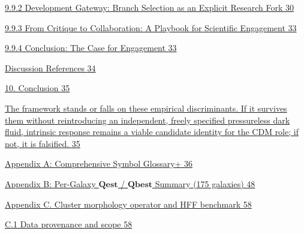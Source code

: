 \documentclass[11pt]{article}
\begin{document}
\hyperref[development-gateway-branch-selection-as-an-explicit-research-fork]{9.9.2 Development Gateway: Branch Selection as an Explicit Research Fork \hyperref[development-gateway-branch-selection-as-an-explicit-research-fork]{30}}

\hyperref[from-critique-to-collaboration-a-playbook-for-scientific-engagement]{9.9.3 From Critique to Collaboration: A Playbook for Scientific Engagement \hyperref[from-critique-to-collaboration-a-playbook-for-scientific-engagement]{33}}

\hyperref[conclusion-the-case-for-engagement]{9.9.4 Conclusion: The Case for Engagement \hyperref[conclusion-the-case-for-engagement]{33}}

\hyperref[discussion-references]{Discussion References \hyperref[discussion-references]{34}}

\hyperref[conclusion]{10. Conclusion \hyperref[conclusion]{35}}

\hyperref[the-framework-stands-or-falls-on-these-empirical-discriminants.-if-it-survives-them-without-reintroducing-an-independent-freely-specified-pressureless-dark-fluid-intrinsic-response-remains-a-viable-candidate-identity-for-the-cdm-role-if-not-it-is-falsified.]{The framework stands or falls on these empirical discriminants. If it survives them without reintroducing an independent, freely specified pressureless dark fluid, intrinsic response remains a viable candidate identity for the CDM role; if not, it is falsified. \hyperref[the-framework-stands-or-falls-on-these-empirical-discriminants.-if-it-survives-them-without-reintroducing-an-independent-freely-specified-pressureless-dark-fluid-intrinsic-response-remains-a-viable-candidate-identity-for-the-cdm-role-if-not-it-is-falsified.]{35}}

\hyperref[appendix-a-comprehensive-symbol-glossary]{Appendix A: Comprehensive Symbol Glossary+ \hyperref[appendix-a-comprehensive-symbol-glossary]{36}}

\hyperref[appendix-b-per-galaxy-mathbfq_mathbfest-mathbfq_mathbfbest-summary-175-galaxies]{Appendix B: Per-Galaxy \(\mathbf{Qest}\) / \(\mathbf{Qbest}\) Summary (175 galaxies) \hyperref[appendix-b-per-galaxy-mathbfq_mathbfest-mathbfq_mathbfbest-summary-175-galaxies]{48}}

\hyperref[appendix-c.-cluster-morphology-operator-and-hff-benchmark]{Appendix C. Cluster morphology operator and HFF benchmark \hyperref[appendix-c.-cluster-morphology-operator-and-hff-benchmark]{58}}

\hyperref[c.1-data-provenance-and-scope]{C.1 Data provenance and scope \hyperref[c.1-data-provenance-and-scope]{58}}
\end{document}
